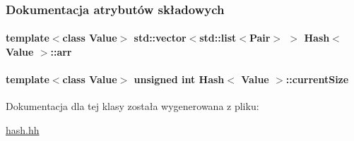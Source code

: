 \subsubsection{Dokumentacja atrybutów składowych}
\hypertarget{class_hash_a7b9b2d05e24652dff58301e63249c9cd}{
\paragraph[{arr}]{\setlength{\rightskip}{0pt plus 5cm}template$<$class Value$>$ std\-::vector$<$std\-::list$<${\bf Pair}$>$ $>$ {\bf Hash}$<$ Value $>$\-::arr\hspace{0.3cm}{\ttfamily [private]}}}\label{class_hash_a7b9b2d05e24652dff58301e63249c9cd}
\hypertarget{class_hash_a0f03c3a895fe6336499844f75c6ec47e}{
\paragraph[{current\-Size}]{\setlength{\rightskip}{0pt plus 5cm}template$<$class Value$>$ unsigned int {\bf Hash}$<$ Value $>$\-::current\-Size\hspace{0.3cm}{\ttfamily [private]}}}\label{class_hash_a0f03c3a895fe6336499844f75c6ec47e}


Dokumentacja dla tej klasy została wygenerowana z pliku\-:\begin{DoxyCompactItemize}
\item 
\hyperlink{hash_8hh}{hash.\-hh}\end{DoxyCompactItemize}

